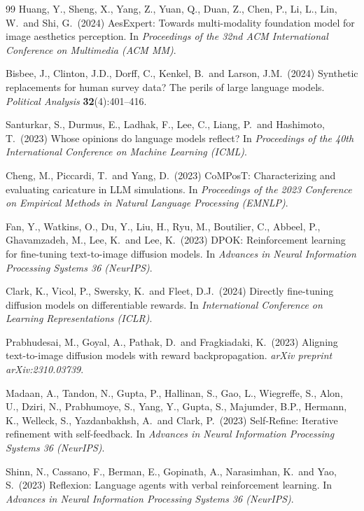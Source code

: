 \documentclass[10pt,twocolumn,letterpaper]{article}
\begin{document}
\begin{thebibliography}{99}
Huang, Y., Sheng, X., Yang, Z., Yuan, Q., Duan, Z., Chen, P., Li, L., Lin, W.\ and Shi, G.\ (2024)
AesExpert: Towards multi-modality foundation model for image aesthetics perception.
In {\it Proceedings of the 32nd ACM International Conference on Multimedia (ACM MM)}.

Bisbee, J., Clinton, J.D., Dorff, C., Kenkel, B.\ and Larson, J.M.\ (2024)
Synthetic replacements for human survey data? The perils of large language models.
{\it Political Analysis} {\bf 32}(4):401--416.

Santurkar, S., Durmus, E., Ladhak, F., Lee, C., Liang, P.\ and Hashimoto, T.\ (2023)
Whose opinions do language models reflect?
In {\it Proceedings of the 40th International Conference on Machine Learning (ICML)}.

Cheng, M., Piccardi, T.\ and Yang, D.\ (2023)
CoMPosT: Characterizing and evaluating caricature in LLM simulations.
In {\it Proceedings of the 2023 Conference on Empirical Methods in Natural Language Processing (EMNLP)}.

Fan, Y., Watkins, O., Du, Y., Liu, H., Ryu, M., Boutilier, C., Abbeel, P., Ghavamzadeh, M.,
Lee, K.\ and Lee, K.\ (2023)
DPOK: Reinforcement learning for fine-tuning text-to-image diffusion models.
In {\it Advances in Neural Information Processing Systems 36 (NeurIPS)}.

Clark, K., Vicol, P., Swersky, K.\ and Fleet, D.J.\ (2024)
Directly fine-tuning diffusion models on differentiable rewards.
In {\it International Conference on Learning Representations (ICLR)}.

Prabhudesai, M., Goyal, A., Pathak, D.\ and Fragkiadaki, K.\ (2023)
Aligning text-to-image diffusion models with reward backpropagation.
{\it arXiv preprint arXiv:2310.03739}.

Madaan, A., Tandon, N., Gupta, P., Hallinan, S., Gao, L., Wiegreffe, S., Alon, U., Dziri, N.,
Prabhumoye, S., Yang, Y., Gupta, S., Majumder, B.P., Hermann, K., Welleck, S., Yazdanbakhsh, A.\
and Clark, P.\ (2023)
Self-Refine: Iterative refinement with self-feedback.
In {\it Advances in Neural Information Processing Systems 36 (NeurIPS)}.

Shinn, N., Cassano, F., Berman, E., Gopinath, A., Narasimhan, K.\ and Yao, S.\ (2023)
Reflexion: Language agents with verbal reinforcement learning.
In {\it Advances in Neural Information Processing Systems 36 (NeurIPS)}.


\end{thebibliography}
\end{document}
